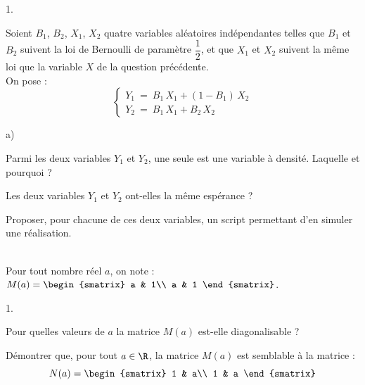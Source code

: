 \documentclass[11pt]{article}%
\begin{document}
\begin{exerciceAP}
\begin{noliste}{1.}
    \item Soient $B_1$, $B_2$, $X_1$, $X_2$ quatre variables
      aléatoires indépendantes telles que $B_1$ et $B_2$ suivent la loi de 
      Bernoulli de paramètre $\dfrac{1}{2}$, et que $X_1$ et $X_2$ 
      suivent la même loi que la variable $X$ de la question
      précédente.\\
      On pose :
      \[
        \left\{
        \begin{array}{l}
          Y_1 \ = \ B_1 \, X_1 + (1-B_1) \, X_2
          \\[.2cm]
          Y_2 \ = \ B_1 \, X_1 + B_2 \, X_2
        \end{array}
        \right.
      \]
      \begin{noliste}{a)}
      \setlength{\itemsep}{2mm}
      \item Parmi les deux variables $Y_1$ et $Y_2$, une seule est une
        variable à densité. Laquelle et pourquoi ?
        
      \item Les deux variables $Y_1$ et $Y_2$ ont-elles la même
        espérance ?
        
      \item Proposer, pour chacune de ces deux variables, un script
        \Scilab{} permettant d'en simuler une réalisation.
      \end{noliste}
  \end{noliste}
\end{exerciceAP}


\begin{exerciceSP}~\\
  Pour tout nombre réel $a$, on note : $M(a) =
  \begin{smatrix}
   a & 1\\
   a & 1
  \end{smatrix}$.
  \begin{noliste}{1.}
    \setlength{\itemsep}{2mm}
   \item Pour quelles valeurs de $a$ la matrice $M(a)$ est-elle 
     diagonalisable ?
   
   \item Démontrer que, pour tout $a\in \R$, la matrice $M(a)$ est
     semblable à la matrice :
     \[
       N(a) =
       \begin{smatrix}
         1 & a\\
         1 & a
       \end{smatrix}
     \]
  \end{noliste}
\end{exerciceSP}
\end{document}
